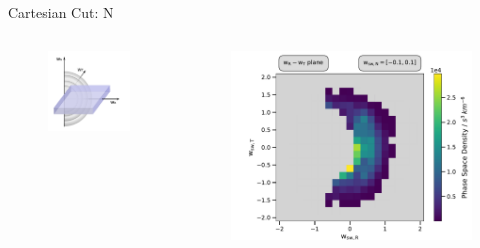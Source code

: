 \documentclass{beamer}
\begin{document}
\begin{frame}[plain]{Cartesian Cut: N}
\begin{columns}
\column{3cm}
\begin{figure}
	\includegraphics[scale=.7]{Pics/slice_N2.pdf}
\end{figure}
\column{6.5cm}
\begin{figure}
	\includegraphics[scale=.45]{Pics/slice_psd_N.pdf}
\end{figure}
\column{.5cm}
\end{columns}
\end{frame}
\end{document}
